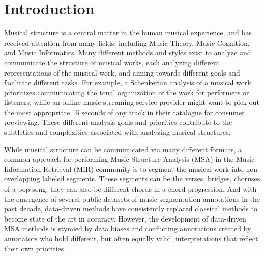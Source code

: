 \section{Introduction}
Musical structure is a central matter in the human musical experience, and has received attention from many fields, including Music Theory, Music Cognition, and Music Informatics.
Many different methods and styles exist to analyze and communicate the structure of musical works, each analyzing different representations of the musical work, and aiming towards different goals and facilitate different tasks.
For example, a Schenkerian analysis of a musical work prioritizes communicating the tonal organization of the work for performers or listeners; while an online music streaming service provider might want to pick out the most appropriate 15 seconds of any track in their catalogue for consumer previewing.
These different analysis goals and priorities contribute to the subtleties and complexities associated with analyzing musical structures.

While musical structure can be communicated via many different formats, a common approach for performing Music Structure Analysis (MSA) in the Music Information Retrieval (MIR) community is to segment the musical work into non-overlapping labeled segments.
These segments can be the verses, bridges, choruses of a pop song; they can also be different chords in a chord progression.
And with the emergence of several public datasets of music segmentation annotations in the past decade, data-driven methods have consistently replaced classical methods to become state of the art in accuracy.
However, the development of data-driven MSA methods is stymied by data biases and conflicting annotations created by annotators who hold different, but often equally valid, interpretations that reflect their own priorities.


